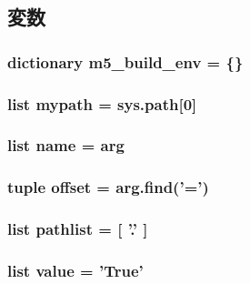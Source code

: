 \subsection{変数}
\hypertarget{namespacegenini_a94909331988af62d194b4c4a2bf41835}{
\subsubsection[{m5\_\-build\_\-env}]{\setlength{\rightskip}{0pt plus 5cm}dictionary {\bf m5\_\-build\_\-env} = \{\}}}
\label{namespacegenini_a94909331988af62d194b4c4a2bf41835}
\hypertarget{namespacegenini_af003d3efd88ef6dd85ffdf56beccdcd2}{
\subsubsection[{mypath}]{\setlength{\rightskip}{0pt plus 5cm}list {\bf mypath} = sys.path\mbox{[}0\mbox{]}}}
\label{namespacegenini_af003d3efd88ef6dd85ffdf56beccdcd2}
\hypertarget{namespacegenini_a246c983618eb29ab8c7afd521134f631}{
\subsubsection[{name}]{\setlength{\rightskip}{0pt plus 5cm}list {\bf name} = arg}}
\label{namespacegenini_a246c983618eb29ab8c7afd521134f631}
\hypertarget{namespacegenini_a03fbaceb13719d1bc975d26c3b92761a}{
\subsubsection[{offset}]{\setlength{\rightskip}{0pt plus 5cm}tuple {\bf offset} = arg.find('=')}}
\label{namespacegenini_a03fbaceb13719d1bc975d26c3b92761a}
\hypertarget{namespacegenini_a5c9252f42a495ae8bb6c1a8dd3e08ecb}{
\subsubsection[{pathlist}]{\setlength{\rightskip}{0pt plus 5cm}list {\bf pathlist} = \mbox{[} '.' \mbox{]}}}
\label{namespacegenini_a5c9252f42a495ae8bb6c1a8dd3e08ecb}
\hypertarget{namespacegenini_a7e5f482a3a8a4f98bd1a9c124485f572}{
\subsubsection[{value}]{\setlength{\rightskip}{0pt plus 5cm}list {\bf value} = 'True'}}
\label{namespacegenini_a7e5f482a3a8a4f98bd1a9c124485f572}
